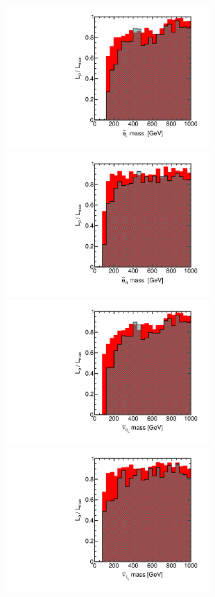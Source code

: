 \begin{figure}[htbp]
\begin{center}
\includegraphics[height=5.5cm]{figs/fig_e_L.pdf} 
\includegraphics[height=5.5cm]{figs/fig_e_R.pdf} \\
\includegraphics[height=5.5cm]{figs/fig_nu_e_L.pdf} 
\includegraphics[height=5.5cm]{figs/fig_nu_tau_L.pdf} \\

\end{center}
\end{figure}
